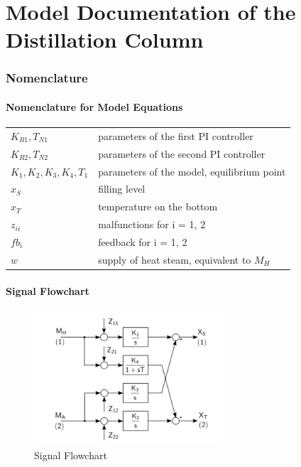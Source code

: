 \documentclass[10pt,a4paper]{article}
\begin{document}
	\part*{Model Documentation of the \\ Distillation Column} %
	
	
	\section{Nomenclature} %
	\subsection{Nomenclature for Model Equations} %
	
	\begin{tabular}{ll}
		$K_{R1}, T_{N1}$ & parameters of the first PI controller \\
		$K_{R2}, T_{N2}$ & parameters of the second PI controller \\
		$K_1, K_2, K_3, K_4, T_1$ & parameters of the model, equilibrium point \\
		$x_S$ & filling level\\
		$x_T$ & temperature on the bottom\\
		$z_{ii}$ & malfunctions for i = 1, 2 \\
		$fb_i$ & feedback for i = 1, 2 \\
		$w$ & supply of heat steam, equivalent to  $M_H$ \\
				
	\end{tabular}
	
	\subsection{Signal Flowchart}
	\begin{figure}[H]
		\centering
		\includegraphics[width=70mm]{flowchart.pdf}
		\caption{Signal Flowchart}
	\end{figure}
	 
\end{document}
